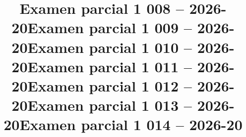 \documentclass{exam}
\begin{document}
\cleartoeven
\setcounter{questioncounter}{0}
\setcounter{page}{1}
\title{Examen parcial 1 008 -- 2026-20}
\makeexamheader


\newpage
\programmingGrid
\newpage

\newpage

\newpage

\cleartoeven
\setcounter{questioncounter}{0}
\setcounter{page}{1}
\title{Examen parcial 1 009 -- 2026-20}
\makeexamheader


\newpage
\programmingGrid
\newpage

\newpage

\newpage

\cleartoeven
\setcounter{questioncounter}{0}
\setcounter{page}{1}
\title{Examen parcial 1 010 -- 2026-20}
\makeexamheader


\newpage

\newpage
\programmingGrid
\newpage

\newpage

\cleartoeven
\setcounter{questioncounter}{0}
\setcounter{page}{1}
\title{Examen parcial 1 011 -- 2026-20}
\makeexamheader


\newpage

\newpage

\newpage
\programmingGrid
\newpage

\cleartoeven
\setcounter{questioncounter}{0}
\setcounter{page}{1}
\title{Examen parcial 1 012 -- 2026-20}
\makeexamheader


\newpage

\newpage
\programmingGrid
\newpage

\newpage

\cleartoeven
\setcounter{questioncounter}{0}
\setcounter{page}{1}
\title{Examen parcial 1 013 -- 2026-20}
\makeexamheader


\newpage

\newpage

\newpage
\programmingGrid
\newpage

\cleartoeven
\setcounter{questioncounter}{0}
\setcounter{page}{1}
\title{Examen parcial 1 014 -- 2026-20}
\makeexamheader
\end{document}
